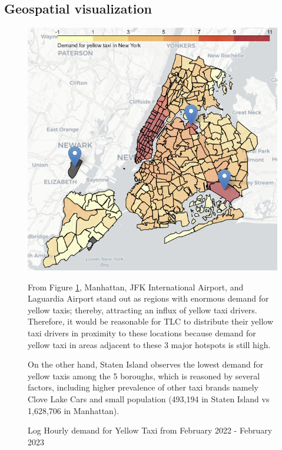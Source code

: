 \documentclass[11pt]{article}
\begin{document}
\subsection{Geospatial visualization}


\begin{figure}[ht]
    \begin{minipage}{0.5\linewidth}
        \begin{adjustbox}{left}
            \includegraphics[width=\textwidth]{plots/yellow taxi constant.png}
            
        \end{adjustbox}
    \end{minipage}
    \begin{minipage}{0.5\linewidth}
From Figure \ref{fig:yellow subway constant}, Manhattan, JFK International Airport, and Laguardia Airport stand out as regions with enormous demand for yellow taxis; thereby, attracting an influx of yellow taxi drivers. Therefore, it would be reasonable for TLC to distribute their yellow taxi drivers in proximity to these locations because demand for yellow taxi in areas adjacent to these 3 major hotspots is still high.

On the other hand, Staten Island observes the lowest demand for yellow taxis among the 5 boroughs, which is reasoned by several factors, including higher prevalence of other taxi brands namely Clove Lake Cars and small population (493,194 in Staten Island vs 1,628,706 in Manhattan). 
    \end{minipage}
        \caption{Log Hourly demand for Yellow Taxi from February 2022 - February 2023}
    
    \label{fig:yellow subway constant}
\end{figure}
\end{document}
